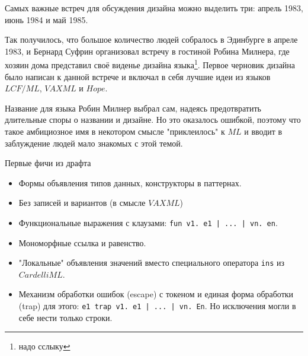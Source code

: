 \documentclass[14pt]{matmex-diploma-custom}
\begin{document}
Самых важные встреч для обсуждения дизайна можно выделить три: апрель 1983, июнь 1984 и май 1985. 

Так получилось, что большое количество людей собралось в Эдинбурге в апреле 1983, и Бернард Суфрин организовал встречу в гостиной Робина Милнера, где хозяин дома представил своё виденье дизайна языка\footnote{надо сслыку}. Первое черновик дизайна было написан к данной встрече и включал в себя лучшие идеи из языков $LCF/ML$, $VAX ML$ и $Hope$. 


Название для языка Робин Милнер выбрал сам, надеясь предотвратить длительные споры о названии и дизайне. Но это оказалось ошибкой, поэтому что такое амбициозное имя в некотором смысле "приклеилось" к $ML$ и вводит в заблуждение людей мало знакомых с этой темой.

Первые фичи из драфта
\begin{itemize}
\item Формы объявления типов данных, конструкторы в паттернах.
\item Без записей и вариантов (в смысле $VAX ML$)
\item Функциональные выражения с клаузами: \verb=fun v1. e1 | ... | vn. en=.
\item Мономорфные ссылка и равенство.
\item "Локальные" объявления значений вместо специального оператора \verb=ins= из $Cardelli ML$.
\item Механизм обработки ошибок (escape) с токеном и единая форма обработки (trap) для этого: \verb=e1 trap v1. e1 | ... | vn. En=. Но исключения могли в себе нести только строки.
\end{itemize}
%
\end{document}

